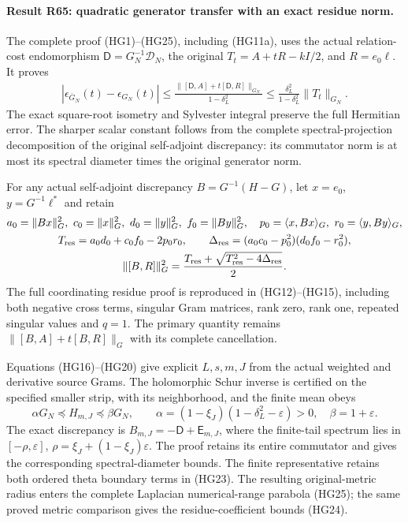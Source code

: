 \paragraph{Result R65: quadratic generator transfer with an exact residue norm.}
The complete proof (HG1)--(HG25), including (HG11a), uses the
actual relation-cost endomorphism $\mathsf D=G_N^{-1}\mathscr D_N$,
the original $T_t=A+tR-kI/2$, and $R=e_0\ell$. It proves
\[
\begin{gathered}
 |\epsilon_{\overline G_N}(t)-\epsilon_{G_N}(t)|
 \le\frac{\|[\mathsf D,A]+t[\mathsf D,R]\|_{G_N}}{1-\delta_L^2}
 \le\frac{\delta_L^2}{1-\delta_L^2}\|T_t\|_{G_N}.
\end{gathered}
\]
The exact square-root isometry and Sylvester integral preserve
the full Hermitian error. The sharper scalar constant follows
from the complete spectral-projection decomposition of the
original self-adjoint discrepancy: its commutator norm is at
most its spectral diameter times the original generator norm.

For any actual self-adjoint discrepancy $B=G^{-1}(H-G)$, let
$x=e_0$, $y=G^{-1}\ell^*$ and retain
\[
\begin{gathered}
 a_0=\|Bx\|_G^2,\ c_0=\|x\|_G^2,\ d_0=\|y\|_G^2,
 \ f_0=\|By\|_G^2,\quad
 p_0=\langle x,Bx\rangle_G,\ r_0=\langle y,By\rangle_G,\\
 T_{\rm res}=a_0d_0+c_0f_0-2p_0r_0,\qquad
 \Delta_{\rm res}=(a_0c_0-p_0^2)(d_0f_0-r_0^2),\\
 \|[B,R]\|_G^2=
 \frac{T_{\rm res}+\sqrt{T_{\rm res}^2-4\Delta_{\rm res}}}{2}.
\end{gathered}
\]
The full coordinating residue proof is reproduced in (HG12)--(HG15),
including both negative cross terms, singular Gram matrices,
rank zero, rank one, repeated singular values and $q=1$.
The primary quantity remains $\|[B,A]+t[B,R]\|_G$ with its
complete cancellation.

Equations (HG16)--(HG20) give explicit $L,s,m,J$ from the actual
weighted and derivative source Grams. The holomorphic Schur
inverse is certified on the specified smaller strip, with its
neighborhood, and the finite mean obeys
\[
 \alpha G_N\preceq H_{m,J}\preceq\beta G_N,\qquad
 \alpha=(1-\xi_J)(1-\delta_L^2-\varepsilon)>0,
 \quad\beta=1+\varepsilon.
\]
The exact discrepancy is $B_{m,J}=-\mathsf D+\mathsf E_{m,J}$,
where the finite-tail spectrum lies in $[-\rho,\varepsilon]$,
$\rho=\xi_J+(1-\xi_J)\varepsilon$. The proof retains its entire
commutator and gives the corresponding spectral-diameter bounds.
The finite representative retains both ordered theta boundary
terms in (HG23). The resulting original-metric radius enters the
complete Laplacian numerical-range parabola (HG25); the same proved
metric comparison gives the residue-coefficient bounds (HG24).

